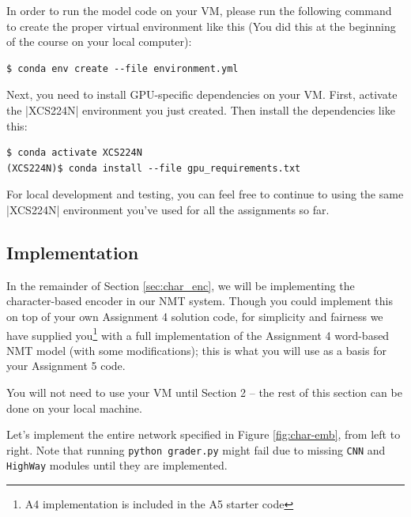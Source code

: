 In order to run the model code on your VM, please run the following command to create the proper virtual environment like this (You did this at the beginning of the course on your local computer):

\begin{lstlisting}
$ conda env create --file environment.yml
\end{lstlisting}

Next, you need to install GPU-specific dependencies on your VM.  First, activate the |XCS224N| environment you just created.  Then install the dependencies like this:

\begin{lstlisting}
$ conda activate XCS224N
(XCS224N)$ conda install --file gpu_requirements.txt
\end{lstlisting}

For local development and testing, you can feel free to continue to using the same |XCS224N| environment you've used for all the assignments so far.

\subsection*{Implementation}
In the remainder of Section \ref{sec:char_enc}, we will be implementing the character-based encoder in our NMT system.
Though you could implement this on top of your own Assignment 4 solution code, for simplicity and fairness we have supplied you\footnote{A4 implementation is included in the A5 starter code} with a full implementation of the Assignment 4 word-based NMT model (with some modifications); this is what you will use as a basis for your Assignment 5 code. 

You will not need to use your VM until Section 2 -- the rest of this section can be done on your local machine.

Let's implement the entire network specified in Figure \ref{fig:char-emb}, from left to right. Note that running \texttt{python grader.py} might fail due to missing \texttt{CNN} and \texttt{HighWay} modules until they are implemented.

